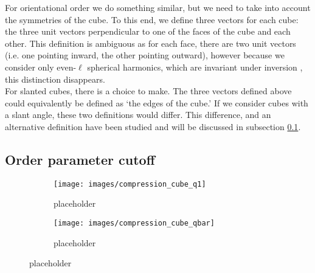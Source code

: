 \documentclass[thesis]{subfiles}
\begin{document}
For orientational order we do something similar, but we need to take into account the symmetries of the cube. To this end, we define three vectors for each cube: the three unit vectors perpendicular to one of the faces of the cube and each other. This definition is ambiguous as for each face, there are two unit vectors (i.e. one pointing inward, the other pointing outward), however because we consider only even-$\ell$ spherical harmonics, which are invariant under inversion \cite{steinhardt1983bond}, this distinction disappears.\\
For slanted cubes, there is a choice to make. The three vectors defined above could equivalently be defined as `the edges of the cube.' If we consider cubes with a slant angle, these two definitions would differ. This difference, and an alternative definition have been studied and will be discussed in subsection \ref{subsec:order param cutoff}. 

\subsection{Order parameter cutoff} \label{subsec:order param cutoff}


\begin{figure}[h]
	\centering
	\begin{subfigure}{0.48\textwidth}
		\centering
		\texttt{[image: images/compression\_cube\_q1]}
		\caption{placeholder}
	\end{subfigure}
	\begin{subfigure}{0.51\textwidth}
		\centering
		\texttt{[image: images/compression\_cube\_qbar]}
		\caption{placeholder}
	\end{subfigure}
	\caption{placeholder}
\end{figure}


\printbibliography[%
]
\end{document}
